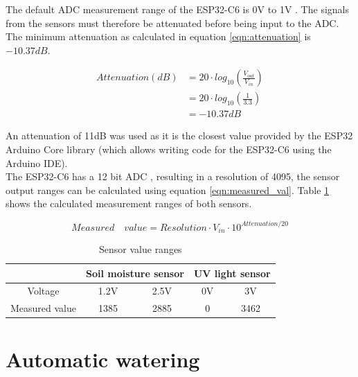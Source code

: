 The default ADC measurement range of the ESP32-C6 is 0V to 1V \cite{esp_datasheet} \cite{esp_github}. The signals from the sensors must therefore be attenuated before being input to the ADC. The minimum attenuation as calculated in equation \ref{eqn:attenuation} \cite{attenuation_formula} is \(-10.37 dB\).

\begin{equation}
\label{eqn:attenuation}
\begin{split}
    Attenuation  (dB) & = 20 \cdot log_{10}\left ( \frac{V_{out}}{V_{in}} \right ) \\ 
    & = 20 \cdot log_{10}\left ( \frac{1}{3.3} \right ) \\ 
    & = -10.37 dB
\end{split}
\end{equation}

An attenuation of 11dB was used as it is the closest value provided by the ESP32 Arduino Core library \cite{esp_arduino_github} (which allows writing code for the ESP32-C6 using the Arduino IDE). 
\\
The ESP32-C6 has a 12 bit ADC \cite{esp_tech_ref}, resulting in a resolution of 4095, the sensor output ranges can be calculated using equation \ref{eqn:measured_val}. Table \ref{tab:sensor_ranges} shows the calculated measurement ranges of both sensors.

\begin{equation}
\label{eqn:measured_val}
    Measured \quad value = Resolution \cdot V_{in} \cdot 10^{Attenuation / 20}
\end{equation}

\begin{table}[!h]
    \centering
    \begin{tabular}{|c|cc|cc|}
    \hline
         & \multicolumn{2}{c||}{Soil moisture sensor} & \multicolumn{2}{c|}{UV light sensor} \\
        \hline
        Voltage & 1.2V & 2.5V & 0V & 3V \\
        Measured value & 1385 & 2885 & 0 & 3462\\
        \hline
    \end{tabular}
    \caption{Sensor value ranges}
    \label{tab:sensor_ranges}
\end{table}

\section{Automatic watering}

